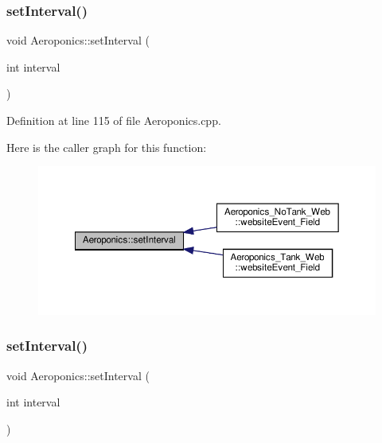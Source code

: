 \mbox{\label{class_aeroponics_a769b673b25fad588fd2dc013f5a62132}} 
\subsubsection{\texorpdfstring{set\+Interval()}{setInterval()}\hspace{0.1cm}{\footnotesize\ttfamily [1/2]}}
{\footnotesize\ttfamily void Aeroponics\+::set\+Interval (\begin{DoxyParamCaption}\item[{int}]{interval }\end{DoxyParamCaption})\hspace{0.3cm}{\ttfamily [protected]}}



Definition at line 115 of file Aeroponics.\+cpp.

Here is the caller graph for this function\+:
\nopagebreak
\begin{figure}[H]
\begin{center}
\leavevmode
\includegraphics[width=350pt]{class_aeroponics_a769b673b25fad588fd2dc013f5a62132_icgraph}
\end{center}
\end{figure}
\mbox{\label{class_aeroponics_a769b673b25fad588fd2dc013f5a62132}} 
\subsubsection{\texorpdfstring{set\+Interval()}{setInterval()}\hspace{0.1cm}{\footnotesize\ttfamily [2/2]}}
{\footnotesize\ttfamily void Aeroponics\+::set\+Interval (\begin{DoxyParamCaption}\item[{int}]{interval }\end{DoxyParamCaption})\hspace{0.3cm}{\ttfamily [protected]}}

